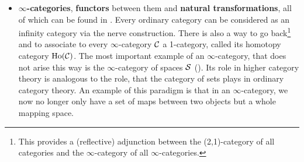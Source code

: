 \begin{itemize}
    \item \textbf{$\infty$-categories}, \textbf{functors} between them and \textbf{natural transformations}, all of which can be found in \cite[Chapter~1]{HigherToposTheory}. Every ordinary category can be considered as an infinity category via the nerve construction. There is also a way to go back\footnote{This provides a (reflective) adjunction between the (2,1)-category of all categories and the $\infty$-category of all $\infty$-categories.} and to associate to every $\infty$-category $\mathcal{C}$ a 1-category, called its homotopy category $\operatorname{Ho}(\mathcal{C})$.
    The most important example of an $\infty$-category, that does not arise this way is the $\infty$-category of spaces $\mathcal{S}$ (\cite[Section~1.2.6]{HigherToposTheory}). Its role in higher category theory is analogous to the role, that the category of sets plays in ordinary category theory. An example of this paradigm is that in an $\infty$-category, we now no longer only have a set of maps between two objects but a whole mapping space. 
    

\end{itemize}

